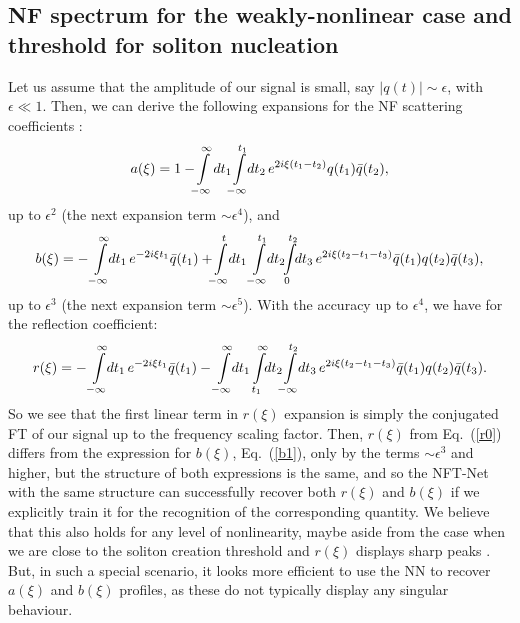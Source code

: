 \subsection*{NF spectrum for the weakly-nonlinear case and threshold for soliton nucleation}
Let us assume that the amplitude of our signal is small, say $|q(t)| \sim \epsilon$, with $\epsilon \ll 1$. Then, we can derive the following expansions for the NF scattering coefficients \cite{pdt13}:
\begin{equation}\label{a1}
a(\xi) = 1 - \!\! \intop_{-\infty}^{\infty} \! dt_1 \!\! \intop_{-\infty}^{t_1} \!\! dt_2 \, e^{2 i \xi (t_1-t_2)} q(t_1) \bar q(t_2),
\end{equation}
up to $\epsilon^2$ (the next expansion term $\sim \epsilon^4$), and
\begin{equation}\label{b1}
b(\xi) = -\intop_{-\infty}^{\infty} \!\! dt_1 \, e^{- 2 i \xi t_1} \bar q(t_1) +  \!\! \intop_{-\infty}^{t} \!\! dt_1 \intop_{-\infty}^{t_1} \! \!dt_2 \!\! \intop_{0}^{t_2}\!\!  dt_3 \, e^{2 i \xi (t_2-t_1-t_3)} \bar q(t_1) q(t_2) \bar q(t_3),
\end{equation}
up to $\epsilon^3$  (the next expansion term $\sim \epsilon^5$). With the accuracy up to $\epsilon^4$, we have for the reflection coefficient:
\begin{equation}\label{r0}
r(\xi) = - \intop_{-\infty}^{\infty} \!\! dt_1 \, e^{- 2 i \xi t_1} \bar q(t_1) -  \intop_{-\infty}^{\infty} \!\! dt_1 \intop_{t_1}^{\infty} \! \!dt_2 \!\! \intop_{-\infty}^{t_2}\!\!  dt_3  \, e^{2 i \xi (t_2-t_1-t_3)} \bar q(t_1) q(t_2) \bar q(t_3) .
\end{equation}
So we see that the first linear term in $r(\xi)$ expansion is simply the conjugated FT of our signal up to the frequency scaling factor. Then, $r(\xi)$ from Eq.~(\ref{r0}) differs from the expression for $b(\xi)$, Eq.~(\ref{b1}), only by the terms $\sim \epsilon^3$ and higher, but the structure of both expressions is the same, and so the NFT-Net with the same structure can successfully recover both $r(\xi)$ and $b(\xi)$ if we explicitly train it for the recognition of the corresponding quantity. We believe that this also holds for any level of nonlinearity, maybe aside from the case when we are close to the soliton creation threshold and $r(\xi)$ displays sharp peaks \cite[Fig. 2]{pdt13}. But, in such a special scenario, it looks more efficient to use the NN to recover $a(\xi)$ and $b(\xi)$ profiles, as these do not typically display any singular behaviour.

